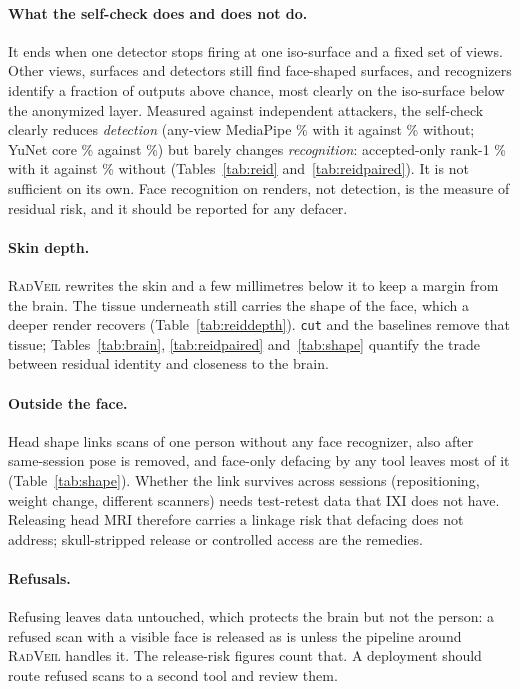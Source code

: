 \documentclass[11pt]{article}
\newcommand{\rv}{\textsc{RadVeil}}
\newcommand{\code}[1]{\texttt{#1}}
\begin{document}
\paragraph{What the self-check does and does not do.} It ends when one
detector stops firing at one iso-surface and a fixed set of views. Other
views, surfaces and detectors still find face-shaped surfaces, and
recognizers identify a fraction of outputs above chance, most clearly on the
iso-surface below the anonymized layer. Measured against independent
attackers, the self-check clearly reduces \emph{detection} (any-view
MediaPipe \atkAdaptiveMediapipeAnyPct\% with it against
\atkAdaptiveNoverifyMediapipeAnyPct\% without; YuNet core
\atkAdaptiveYunetCorePct\% against \atkAdaptiveNoverifyYunetCorePct\%) but
barely changes \emph{recognition}: accepted-only rank-1
\reidArcFaceAdaptiveAccRank\% with it against
\reidArcFaceAdaptiveNoverifyAccRank\% without (Tables~\ref{tab:reid}
and~\ref{tab:reidpaired}). It is not sufficient on its own. Face recognition
on renders, not detection, is the measure of residual risk, and it should be
reported for any defacer.

\paragraph{Skin depth.} \rv{} rewrites the skin and a few millimetres below
it to keep a margin from the brain. The tissue underneath still carries the
shape of the face, which a deeper render recovers (Table~\ref{tab:reiddepth}).
\code{cut} and the baselines remove that tissue; Tables~\ref{tab:brain},
\ref{tab:reidpaired} and~\ref{tab:shape} quantify the trade between residual
identity and closeness to the brain.

\paragraph{Outside the face.} Head shape links scans of one person without
any face recognizer, also after same-session pose is removed, and face-only
defacing by any tool leaves most of it (Table~\ref{tab:shape}). Whether the
link survives across sessions (repositioning, weight change, different
scanners) needs test-retest data that IXI does not have. Releasing head MRI
therefore carries a linkage risk that defacing does not address;
skull-stripped release or controlled access are the remedies.

\paragraph{Refusals.} Refusing leaves data untouched, which protects the
brain but not the person: a refused scan with a visible face is released as
is unless the pipeline around \rv{} handles it. The release-risk figures
count that. A deployment should route refused scans to a second tool and
review them.
\end{document}
